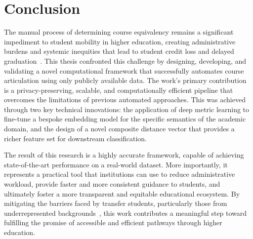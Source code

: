 \section{Conclusion}\label{ch:5.4}
The manual process of determining course equivalency remains a significant impediment to student mobility in higher education, creating administrative burdens and systemic inequities that lead to student credit loss and delayed graduation~\cite{gao2017, collegeopportunity2017}. This thesis confronted this challenge by designing, developing, and validating a novel computational framework that successfully automates course articulation using only publicly available data. The work's primary contribution is a privacy-preserving, scalable, and computationally efficient pipeline that overcomes the limitations of previous automated approaches. This was achieved through two key technical innovations: the application of deep metric learning to fine-tune a bespoke embedding model for the specific semantics of the academic domain, and the design of a novel composite distance vector that provides a richer feature set for downstream classification.

The result of this research is a highly accurate framework, capable of achieving state-of-the-art performance on a real-world dataset. More importantly, it represents a practical tool that institutions can use to reduce administrative workload, provide faster and more consistent guidance to students, and ultimately foster a more transparent and equitable educational ecosystem. By mitigating the barriers faced by transfer students, particularly those from underrepresented backgrounds~\cite{ace2025}, this work contributes a meaningful step toward fulfilling the promise of accessible and efficient pathways through higher education.